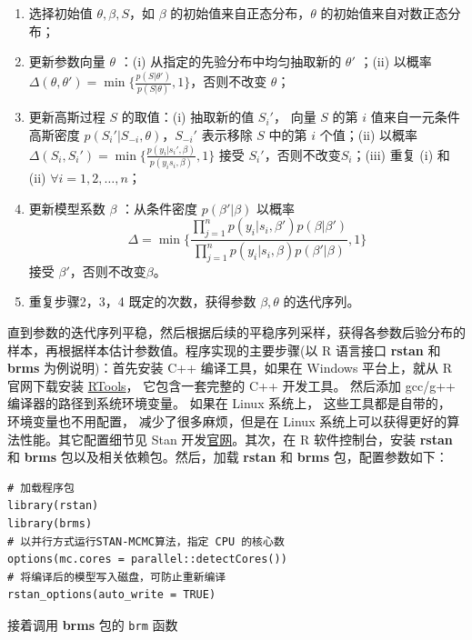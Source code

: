\documentclass[12pt,a4paper,UTF8,twoside]{book}
\providecommand{\tightlist}{%
  \setlength{\itemsep}{0pt}\setlength{\parskip}{0pt}}
\theoremstyle{definition}
\theoremstyle{definition}
\theoremstyle{definition}
\theoremstyle{remark}
\begin{document}
\begin{enumerate}
\def\labelenumi{\arabic{enumi}.}
\tightlist
\item
  选择初始值 \(\theta,\beta,S\)，如 \(\beta\)
  的初始值来自正态分布，\(\theta\) 的初始值来自对数正态分布；
\item
  更新参数向量 \(\theta\) ：(i) 从指定的先验分布中均匀抽取新的
  \(\theta'\) ；(ii) 以概率
  \(\Delta(\theta,\theta') = \min \big\{\frac{p(S|\theta')}{p(S|\theta)},1\big\}\)，否则不改变
  \(\theta\)；
\item
  更新高斯过程 \(S\) 的取值：(i) 抽取新的值 \(S_{i}'\)， 向量 \(S\) 的第
  \(i\) 值来自一元条件高斯密度 \(p(S_{i}'|S_{-i},\theta)\)，\(S_{-i}'\)
  表示移除 \(S\) 中的第 \(i\) 个值；(ii) 以概率
  \(\Delta(S_{i},S_{i}') = \min\big\{ \frac{p(y_{i}|s_{i}',\beta)}{p(y_{i}s_{i},\beta)},1 \big\}\)
  接受 \(S_{i}'\)，否则不改变\(S_i\)；(iii) 重复 (i) 和 (ii)
  \(\forall i = 1,2,\ldots,n\)；
\item
  更新模型系数 \(\beta\) ：从条件密度 \(p(\beta'|\beta)\) 以概率
  \[\Delta = \min \big\{ \frac{\prod_{j=1}^{n}p(y_i|s_{i},\beta')p(\beta|\beta')}{\prod_{j=1}^{n}p(y_i|s_{i},\beta)p(\beta'|\beta)},1  \big\}\]
  接受 \(\beta'\)，否则不改变\(\beta\)。
\item
  重复步骤2，3，4 既定的次数，获得参数 \(\beta,\theta\) 的迭代序列。
\end{enumerate}

\noindent 直到参数的迭代序列平稳，然后根据后续的平稳序列采样，获得各参数后验分布的样本，再根据样本估计参数值。程序实现的主要步骤(以
R 语言接口 \textbf{rstan} 和 \textbf{brms} 为例说明)：首先安装 C++
编译工具，如果在 Windows 平台上，就从 R 官网下载安装
\href{https://cran.r-project.org/bin/windows/Rtools/}{RTools}，
它包含一套完整的 C++ 开发工具。 然后添加 gcc/g++
编译器的路径到系统环境变量。 如果在 Linux 系统上， 这些工具都是自带的，
环境变量也不用配置， 减少了很多麻烦，但是在 Linux
系统上可以获得更好的算法性能。其它配置细节见 Stan
开发\href{https://github.com/stan-dev/rstan/wiki}{官网}。其次，在 R
软件控制台，安装 \textbf{rstan} 和 \textbf{brms}
包以及相关依赖包。然后，加载 \textbf{rstan} 和 \textbf{brms}
包，配置参数如下：

\begin{verbatim}
# 加载程序包
library(rstan)
library(brms)
# 以并行方式运行STAN-MCMC算法，指定 CPU 的核心数
options(mc.cores = parallel::detectCores())
# 将编译后的模型写入磁盘，可防止重新编译
rstan_options(auto_write = TRUE)
\end{verbatim}

\noindent 接着调用 \textbf{brms} 包的 \texttt{brm} 函数
\end{document}
